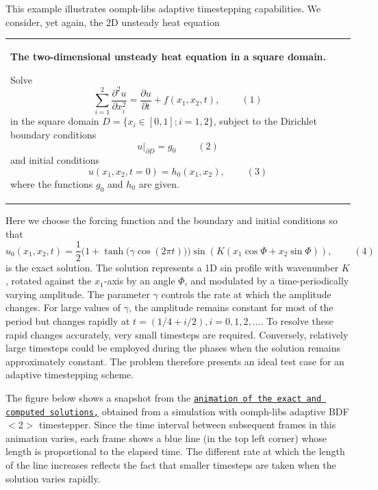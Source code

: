 This example illustrates {\ttfamily oomph-\/lib\textquotesingle{}s} adaptive timestepping capabilities. We consider, yet again, the 2D unsteady heat equation \begin{center} \tabulinesep=1mm
\begin{longtabu} spread 0pt [c]{*{1}{|X[-1]}|}
\hline
\begin{center} {\bfseries The two-\/dimensional unsteady heat equation in a square domain.} \end{center}  Solve \[ \sum_{i=1}^2\frac{\partial^2 u}{\partial x_i^2} = \frac{\partial u}{\partial t} + f\left(x_1,x_2,t\right), \ \ \ \ \ \ \ \ \ \ (1) \] in the square domain $ D = \{x_i \in [0,1]; i=1,2 \} $, subject to the Dirichlet boundary conditions \[ \left. u\right|_{\partial D}=g_0 \ \ \ \ \ \ \ \ \ \ (2) \] and initial conditions \[ u(x_1,x_2,t=0)=h_0(x_1,x_2), \ \ \ \ \ \ \ \ \ \ (3) \] where the functions $ g_0$ and $ h_0$ are given.   \\
\end{longtabu}
\end{center} 

Here we choose the forcing function and the boundary and initial conditions so that \[ u_0(x_1,x_2,t) = \frac{1}{2} \bigg( 1 + \tanh\big(\gamma \cos(2\pi t)\big)\bigg) \sin\left(K \left( x_1 \cos \Phi + x_2 \sin \Phi\right)\right), \ \ \ \ \ \ \ \ \ \ (4) \] is the exact solution. The solution represents a 1D sin profile with wavenumber $ K $, rotated against the $x_1$-\/axis by an angle $ \Phi $, and modulated by a time-\/periodically varying amplitude. The parameter $ \gamma $ controls the rate at which the amplitude changes. For large values of $ \gamma $, the amplitude remains constant for most of the period but changes rapidly at $ t = \left( 1/4 + i/2 \right), i=0,1,2,... $. To resolve these rapid changes accurately, very small timesteps are required. Conversely, relatively large timesteps could be employed during the phases when the solution remains approximately constant. The problem therefore presents an ideal test case for an adaptive timestepping scheme.

The figure below shows a snapshot from the \href{../figures/unsteady_heat_soln.avi}{\tt animation of the exact and computed solutions,} obtained from a simulation with {\ttfamily oomph-\/lib\textquotesingle{}s} adaptive {\ttfamily B\+D\+F$<$2$>$} timestepper. Since the time interval between subsequent frames in this animation varies, each frame shows a blue line (in the top left corner) whose length is proportional to the elapsed time. The different rate at which the length of the line increases reflects the fact that smaller timesteps are taken when the solution varies rapidly.

